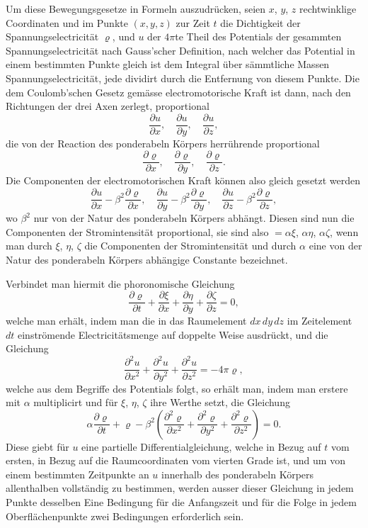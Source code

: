 \documentclass[12pt,a4paper]{book}
\theoremstyle{definition}
\theoremstyle{remark}
\begin{document}
Um diese Bewegungsgesetze in Formeln auszudrücken, seien $x$, $y$, $z$ rechtwinklige Coordinaten und im Punkte $(x, y, z)$ zur Zeit $t$ die Dichtigkeit der Spannungselectricität $\varrho$, und $u$ der $4\pi$te Theil des Potentials der gesammten Spannungselectricität nach Gauss'scher Definition, nach welcher das Potential in einem bestimmten Punkte gleich ist dem Integral über sämmtliche Massen Spannungselectricität, jede dividirt durch die Entfernung von diesem Punkte. Die dem Coulomb'schen Gesetz gemässe electromotorische Kraft ist dann, nach den Richtungen der drei Axen zerlegt, proportional
\[
\frac{\partial u}{\partial x}, \quad \frac{\partial u}{\partial y}, \quad \frac{\partial u}{\partial z},
\]
die von der Reaction des ponderabeln Körpers herrührende proportional
\[
\frac{\partial \varrho}{\partial x}, \quad \frac{\partial \varrho}{\partial y}, \quad \frac{\partial \varrho}{\partial z}.
\]
Die Componenten der electromotorischen Kraft können also gleich gesetzt werden
\[
\frac{\partial u}{\partial x} - \beta^2 \frac{\partial \varrho}{\partial x}, \quad
\frac{\partial u}{\partial y} - \beta^2 \frac{\partial \varrho}{\partial y}, \quad
\frac{\partial u}{\partial z} - \beta^2 \frac{\partial \varrho}{\partial z},
\]
wo $\beta^2$ nur von der Natur des ponderabeln Körpers abhängt. Diesen sind nun die Componenten der Stromintensität proportional, sie sind also $= \alpha \xi$, $\alpha \eta$, $\alpha \zeta$, wenn man durch $\xi$, $\eta$, $\zeta$ die Componenten der Stromintensität und durch $\alpha$ eine von der Natur des ponderabeln Körpers abhängige Constante bezeichnet.

Verbindet man hiermit die phoronomische Gleichung
\[
\frac{\partial \varrho}{\partial t} + \frac{\partial \xi}{\partial x} + \frac{\partial \eta}{\partial y} + \frac{\partial \zeta}{\partial z} = 0,
\]
welche man erhält, indem man die in das Raumelement $dx\,dy\,dz$ im Zeitelement $dt$ einströmende Electricitätsmenge auf doppelte Weise ausdrückt, und die Gleichung
\[
\frac{\partial^2 u}{\partial x^2} + \frac{\partial^2 u}{\partial y^2} + \frac{\partial^2 u}{\partial z^2} = -4\pi \varrho,
\]
welche aus dem Begriffe des Potentials folgt, so erhält man, indem man erstere mit $\alpha$ multiplicirt und für $\xi$, $\eta$, $\zeta$ ihre Werthe setzt, die Gleichung
\[
\alpha \frac{\partial \varrho}{\partial t} + \varrho - \beta^2 \left(\frac{\partial^2 \varrho}{\partial x^2} + \frac{\partial^2 \varrho}{\partial y^2} + \frac{\partial^2 \varrho}{\partial z^2}\right) = 0.
\]
Diese giebt für $u$ eine partielle Differentialgleichung, welche in Bezug auf $t$ vom ersten, in Bezug auf die Raumcoordinaten vom vierten Grade ist, und um von einem bestimmten Zeitpunkte an $u$ innerhalb des ponderabeln Körpers allenthalben vollständig zu bestimmen, werden ausser dieser Gleichung in jedem Punkte desselben Eine Bedingung für die Anfangszeit und für die Folge in jedem Oberflächenpunkte zwei Bedingungen erforderlich sein.
\end{document}
